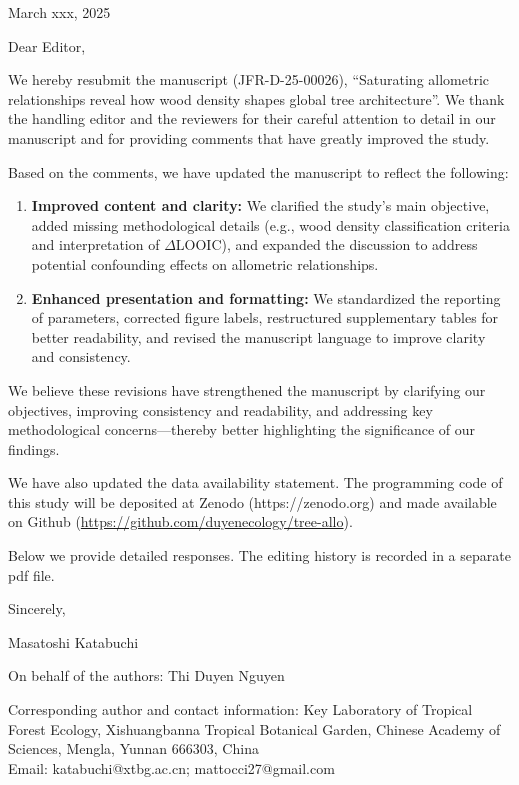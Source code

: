 \documentclass[
  12pt,
  letterpaper,
  DIV=11,
  numbers=noendperiod]{scrartcl}
\author{}
\date{}
\begin{document}
March xxx, 2025

Dear Editor,

We hereby resubmit the manuscript (JFR-D-25-00026), ``Saturating
allometric relationships reveal how wood density shapes global tree
architecture''. We thank the handling editor and the reviewers for their
careful attention to detail in our manuscript and for providing comments
that have greatly improved the study.

Based on the comments, we have updated the manuscript to reflect the
following:

\begin{enumerate}
\def\labelenumi{\arabic{enumi}.}
\item
  \textbf{Improved content and clarity:} We clarified the study's main
  objective, added missing methodological details (e.g., wood density
  classification criteria and interpretation of \(\Delta\)LOOIC), and
  expanded the discussion to address potential confounding effects on
  allometric relationships.
\item
  \textbf{Enhanced presentation and formatting:} We standardized the
  reporting of parameters, corrected figure labels, restructured
  supplementary tables for better readability, and revised the
  manuscript language to improve clarity and consistency.
\end{enumerate}

We believe these revisions have strengthened the manuscript by
clarifying our objectives, improving consistency and readability, and
addressing key methodological concerns---thereby better highlighting the
significance of our findings.

We have also updated the data availability statement. The programming
code of this study will be deposited at Zenodo (https://zenodo.org) and
made available on Github
(\url{https://github.com/duyenecology/tree-allo}).

Below we provide detailed responses. The editing history is recorded in
a separate pdf file.

Sincerely,

Masatoshi Katabuchi

On behalf of the authors: Thi Duyen Nguyen

Corresponding author and contact information: Key Laboratory of Tropical
Forest Ecology, Xishuangbanna Tropical Botanical Garden, Chinese Academy
of Sciences, Mengla, Yunnan 666303, China\\
Email: katabuchi@xtbg.ac.cn; mattocci27@gmail.com
\end{document}

